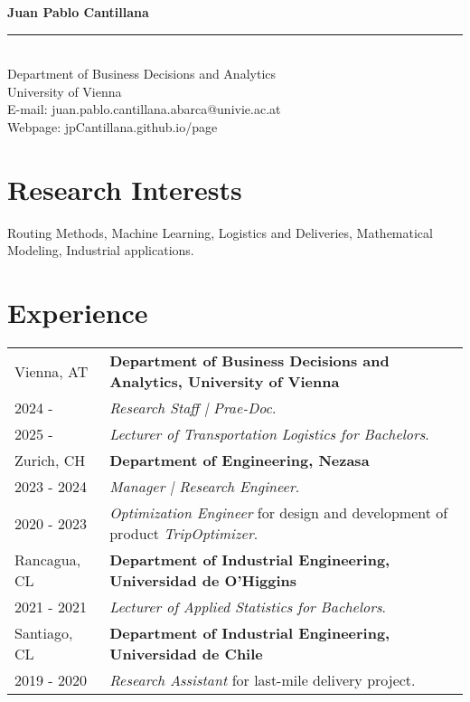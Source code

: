 \documentclass[10pt, a4paper]{article}
\begin{document}
\begin{center}
    {\LARGE \textbf{Juan Pablo Cantillana}} \\[0.2cm]
    \rule{\textwidth}{0.4pt} \\[0.2cm] %
    Department of Business Decisions and Analytics \\
    University of Vienna \\
    E-mail: juan.pablo.cantillana.abarca@univie.ac.at \\
    Webpage: jpCantillana.github.io/page\\
\end{center}

\section*{Research Interests}
Routing Methods, Machine Learning, Logistics and Deliveries, Mathematical Modeling, Industrial applications.

\section*{Experience}

\noindent
\begin{tabular}{@{} p{} p{} @{}}
    Vienna, AT & \textbf{Department of Business Decisions and Analytics, University of Vienna} \\
    2024 -  & \textit{Research Staff | Prae-Doc}. \\
    2025 -  & \textit{Lecturer of Transportation Logistics for Bachelors}. \\
    Zurich, CH & \textbf{Department of Engineering, Nezasa} \\
    2023 - 2024 & \textit{Manager | Research Engineer}. \\
    2020 - 2023 & \textit{Optimization Engineer} for design and development of product \textit{TripOptimizer}.\\
    Rancagua, CL & \textbf{Department of Industrial Engineering, Universidad de O'Higgins} \\
    2021 - 2021 & \textit{Lecturer of Applied Statistics for Bachelors}. \\
    Santiago, CL & \textbf{Department of Industrial Engineering, Universidad de Chile} \\
    2019 - 2020 & \textit{Research Assistant} for last-mile delivery project.\\
\end{tabular}
\end{document}
